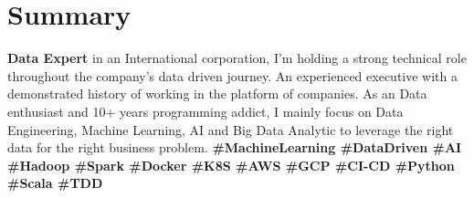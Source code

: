 \section{Summary}
  \textbf{Data Expert} in an International corporation, I’m holding a strong technical role throughout the company’s data driven journey. An experienced executive with a demonstrated history of working in the platform of companies. As an Data enthusiast and 10+ years programming addict, I mainly focus on Data Engineering, Machine Learning, AI and Big Data Analytic to leverage the right data for the right business problem.
  \textbf{\scriptsize{
    \#MachineLearning
    \#DataDriven
    \#AI
    \#Hadoop
    \#Spark
    \#Docker
    \#K8S
    \#AWS
    \#GCP
    \#CI-CD
    \#Python
    \#Scala
    \#TDD
  }}
